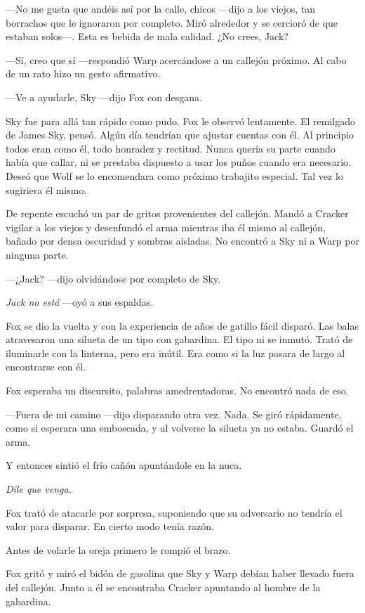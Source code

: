 ---No me gusta que andéis así por la calle, chicos ---dijo a los viejos, tan borrachos que le ignoraron por completo. Miró alrededor y se cercioró de que estaban solos---. Esta es bebida de mala calidad. ¿No crees, Jack?

---Sí, creo que sí ---respondió Warp acercándose a un callejón próximo. Al cabo de un rato hizo un gesto afirmativo.

---Ve a ayudarle, Sky ---dijo Fox con desgana.

Sky fue para allá tan rápido como pudo. Fox le observó lentamente. El remilgado de James Sky, pensó. Algún día tendrían que ajustar cuentas con él. Al principio todos eran como él, todo honradez y rectitud. Nunca quería su parte cuando había que callar, ni se prestaba dispuesto a usar los puños cuando era necesario. Deseó que Wolf se lo encomendara como próximo trabajito especial. Tal vez lo sugiriera él mismo.

De repente escuchó un par de gritos provenientes del callejón. Mandó a Cracker vigilar a los viejos y desenfundó el arma mientras iba él mismo al callejón, bañado por densa oscuridad y sombras aisladas. No encontró a Sky ni a Warp por ninguna parte.

---¿Jack? ---dijo olvidándose por completo de Sky.

\emph{Jack no está} ---oyó a sus espaldas.

Fox se dio la vuelta y con la experiencia de años de gatillo fácil disparó. Las balas atravesaron una silueta de un tipo con gabardina. El tipo ni se inmutó. Trató de iluminarle con la linterna, pero era inútil. Era como si la luz pasara de largo al encontrarse con él.

Fox esperaba un discursito, palabras amedrentadoras. No encontró nada de eso.

---Fuera de mi camino ---dijo disparando otra vez. Nada. Se giró rápidamente, como si esperara una emboscada, y al volverse la silueta ya no estaba. Guardó el arma.

Y entonces sintió el frío cañón apuntándole en la nuca.

\emph{Dile que venga.}

Fox trató de atacarle por sorpresa, suponiendo que su adversario no tendría el valor para disparar. En cierto modo tenía razón.

Antes de volarle la oreja primero le rompió el brazo.

Fox gritó y miró el bidón de gasolina que Sky y Warp debían haber llevado fuera del callejón. Junto a él se encontraba Cracker apuntando al hombre de la gabardina.

